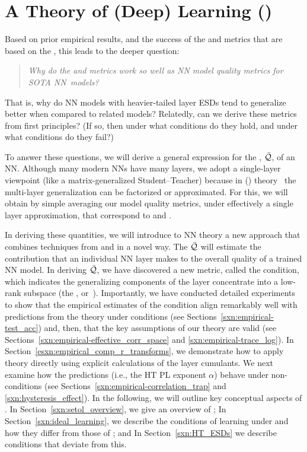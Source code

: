 \section{A \SemiEmpirical Theory of (Deep) Learning (\SETOL)}
\label{sxn:setol}
Based on prior empirical results, and the success of the \ALPHA and \ALPHAHAT metrics that are based on the \HTSR \Phenomenology, this leads to the deeper question: 
%
\begin{quote}
\emph{Why do the \ALPHA and \ALPHAHAT metrics work so well as NN model quality metrics for SOTA NN~models?}
\end{quote}
That is, why do NN models with heavier-tailed layer ESDs tend to generalize better when compared to related models?
Relatedly, can we derive these metrics from first principles?
(If so, then under what conditions do they hold, and under what conditions do they fail?)


\noindent
To answer these questions, we will derive a general expression for the \LayerQuality, $\bar{\mathcal{Q}}$, of an NN.
Although many modern NNs have many layers, we adopt a single-layer viewpoint (like a matrix-generalized Student–Teacher) because in \StatisticalMechanicsOfGeneralization (\SMOG) theory~\cite{SST92,STS90} the multi-layer generalization can be factorized or approximated.
For this, we will obtain by simple averaging our model quality metrics, under effectively a single layer approximation, that correspond to \ALPHA and \ALPHAHAT.


In deriving these quantities, we will introduce to NN theory a new \SemiEmpirical approach that combines techniques from \STATMECH and \RMT in a novel way.
The \LayerQuality $\bar{\mathcal{Q}}$ will estimate the contribution that an individual NN layer makes to the overall quality of a trained NN model.
In deriving $\bar{\mathcal{Q}}$, we have discovered a new \LayerQuality metric, called the \TRACELOG condition,
which indicates the generalizing components of the layer concentrate into a low-rank subspace
(the \emph{\EffectiveCorrelationSpace}, or~\ECS).
Importantly, we have conducted detailed experiments to show 
that the empirical estimates of the \SETOL \TRACELOG condition align remarkably well with predictions from the \HTSR
theory under \Ideal conditions (see Sections~\ref{sxn:empirical-test_acc})
and, then, 
that the key assumptions of our \SETOL theory are valid
(see Sections~\ref{sxn:empirical-effective_corr_space} and \ref{sxn:empirical-trace_log}).
In Section~\ref{esxn:empirical_comp_r_transforms}, we demonstrate how to apply theory directly using explicit calculations of the \RMT layer cumulants.
We next examine how the \HTSR predictions (i.e., the HT PL exponent $\alpha$) behave under non-\Ideal conditions (see Sections~\ref{sxn:empirical-correlation_trap} and \ref{sxn:hysteresis_effect}).
%
In the following, we will outline key conceptual aspects of \SETOL.
In Section~\ref{sxn:setol_overview}, we give an overview of \SETOL;
In Section~\ref{sxn:ideal_learning}, we describe the conditions of \Ideal learning under \SETOL and how they differ from those of \HTSR; and
In Section~\ref{sxn:HT_ESDs} we describe conditions that deviate from this.





